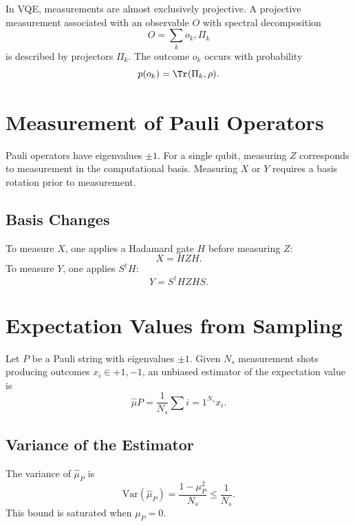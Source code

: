 \documentclass{book}
\begin{document}
In VQE, measurements are almost exclusively projective. A projective measurement associated with an observable $O$ with spectral decomposition
\begin{equation}
O = \sum_k o_k , \Pi_k
\end{equation}
is described by projectors $\Pi_k$. The outcome $o_k$ occurs with probability
\begin{equation}
p(o_k) = \Tr(\Pi_k , \rho).
\end{equation}

\section{Measurement of Pauli Operators}

Pauli operators have eigenvalues $\pm1$. For a single qubit, measuring $Z$ corresponds to measurement in the computational basis. Measuring $X$ or $Y$ requires a basis rotation prior to measurement.

\subsection{Basis Changes}

To measure $X$, one applies a Hadamard gate $H$ before measuring $Z$:
\begin{equation}
X = H Z H.
\end{equation}
To measure $Y$, one applies $S^\dagger H$:
\begin{equation}
Y = S^\dagger H Z H S.
\end{equation}

\section{Expectation Values from Sampling}

Let $P$ be a Pauli string with eigenvalues $\pm1$. Given $N_s$ measurement shots producing outcomes $x_i \in {+1,-1}$, an unbiased estimator of the expectation value is
\begin{equation}
\hat{\mu}P = \frac{1}{N_s} \sum{i=1}^{N_s} x_i.
\end{equation}

\subsection{Variance of the Estimator}

The variance of $\hat{\mu}_P$ is
\begin{equation}
\mathrm{Var}(\hat{\mu}_P) = \frac{1 - \mu_P^2}{N_s} \le \frac{1}{N_s}.
\end{equation}
This bound is saturated when $\mu_P = 0$.
\end{document}
